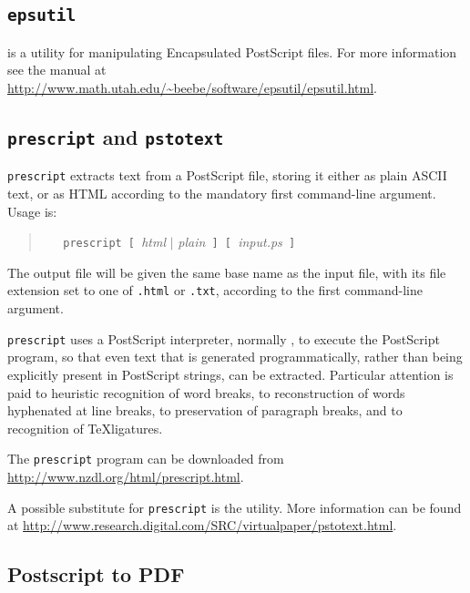 \documentclass[twoside,11pt]{starlink}
\begin{document}
\subsection{\texttt{epsutil}}

is a utility for manipulating Encapsulated PostScript files. For more
information see the manual at \url{http://www.math.utah.edu/~beebe/software/epsutil/epsutil.html}.

\subsection{\texttt{prescript} and \texttt{pstotext}}

\texttt{prescript} extracts text from a PostScript file, storing it
either as plain ASCII text, or as HTML according to the mandatory
first command-line argument. Usage is:

\begin{quote}
\verb+   prescript [ +\emph{html} $\mid$ \emph{plain}\verb+ ] [ +\emph{input.ps}\verb+ ]+
\end{quote}

The output file will be given the same base name as the input file,
with its file extension set to one of \texttt{.html} or \texttt{.txt},
according to the first command-line argument.

\texttt{prescript} uses a PostScript interpreter, normally , to execute the PostScript program, so that even text
that is generated programmatically, rather than being explicitly
present in PostScript strings, can be extracted. Particular attention
is paid to heuristic recognition of word breaks, to reconstruction of
words hyphenated at line breaks, to preservation of paragraph breaks,
and to recognition of \TeX ligatures.

The \texttt{prescript} program can be downloaded from
\url{http://www.nzdl.org/html/prescript.html}.

A possible substitute for \texttt{prescript} is the
utility.  More information can be found at \url{http://www.research.digital.com/SRC/virtualpaper/pstotext.html}.

\subsection{Postscript to PDF\label{sc15_pstopdf}}
\end{document}
